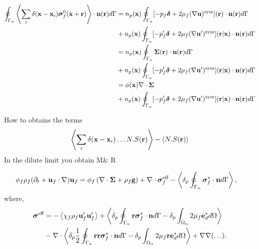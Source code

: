 \documentclass[12pt]{My_preprint}
\begin{document}
\begin{align}
    \oint_{\Gamma_{\alpha}}  \left<\sum_i \delta(\textbf{x}-\textbf{x}_i) \bm\sigma_f^0(\textbf{x}+ \textbf{r}) \right>\cdot \textbf{n}(\textbf{r}) d\Gamma
    &= 
    n_p(\textbf{x})\oint_{\Gamma_{\alpha}}  [-p_f \bm\delta +2 \mu_f (\mathbf{\nabla} \textbf{u})^\text{sym}](\textbf{r})\cdot \textbf{n}(\textbf{r}) d\Gamma\\
    &+ n_p(\textbf{x})\oint_{\Gamma_{\alpha}}  [-p_f' \bm\delta +2 \mu_f (\mathbf{\nabla} \textbf{u}')^\text{sym}](\textbf{r}|\textbf{x})\cdot \textbf{n}(\textbf{r}) d\Gamma\\
    &= 
    n_p(\textbf{x})\oint_{\Gamma_{\alpha}}  \bm\Sigma (\textbf{r})\cdot \textbf{n}(\textbf{r}) d\Gamma\\
    &+ n_p(\textbf{x})\oint_{\Gamma_{\alpha}}  [-p_f' \bm\delta +2 \mu_f (\mathbf{\nabla} \textbf{u}')^\text{sym}](\textbf{r}|\textbf{x})\cdot \textbf{n}(\textbf{r}) d\Gamma\\
    &= 
    \phi (\textbf{x})\mathbf{\nabla}\cdot \bm\Sigma\\
    &+ n_p(\textbf{x})\oint_{\Gamma_{\alpha}}  [-p_f' \bm\delta +2 \mu_f (\mathbf{\nabla} \textbf{u}')^\text{sym}](\textbf{r}|\textbf{x})\cdot \textbf{n}(\textbf{r}) d\Gamma
\end{align}

How to obtains the terms 
\begin{equation}
    \left<
        \sum_i \delta(\textbf{x}-\textbf{x}_i)
        \ldots N.S(\textbf{r})
    \right>
    -\left<
         N.S(\textbf{r})
    \right>
\end{equation}
In the dilute limit you obtain M\& R

\begin{align}
    \phi_f \rho_f(\pddt + \textbf{u}_f  \cdot \grad) \textbf{u}_f
    &= \phi_f 
    \left(\div \bm{\Sigma}
    + \rho_f \textbf{g}\right)
    + \div \bm\sigma_f^{\text{eff}}
    - \pSavg{\bm\sigma_f^{*}\cdot \textbf{n}}, 
    \label{eq:dt_uf2}
\end{align}
where,
\begin{align}
    \bm{\sigma}^{\text{eff}} 
    &= 
    - \avg{\chi_f\rho_f \textbf{u}_f'\textbf{u}_f'} 
    + \pavg{\intS{\textbf{r}\bm\sigma^{*}_f\cdot \textbf{n}} - \delta_p\intO{2\mu_f\textbf{e}_d^*}}\nonumber\\
    &- \div
        \pavg{ \frac{1}{2}\intS{\textbf{rr}\bm\sigma^{*}_f\cdot \textbf{n}}
        - \delta_p\intO{2\mu_f \textbf{r} \textbf{e}_d^*}}
        + \grad\grad (\ldots). 
    \label{eq:def_sigma_eff_f2}
\end{align}
\end{document}
